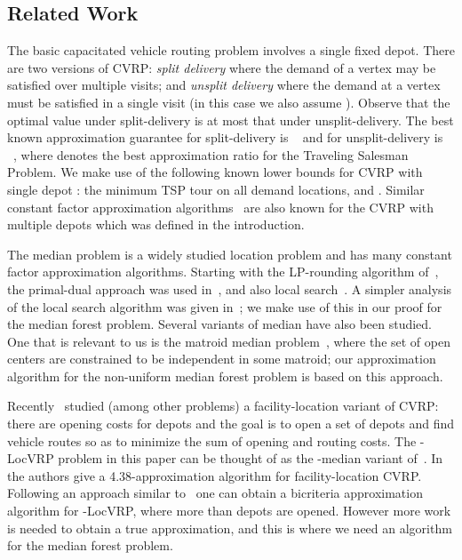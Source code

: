 \documentclass[11pt,twoside,a4paper]{article}
\def\lrp{-LocVRP\xspace}
\begin{document}
\subsection{Related Work}
The basic capacitated vehicle routing problem involves a single fixed depot. There are two versions of CVRP: {\em split
delivery} where the demand of a vertex may be satisfied over multiple visits; and {\em unsplit delivery} where the
demand at a vertex must be satisfied in a single visit (in this case we also assume ). Observe
that the optimal value under split-delivery is at most that under unsplit-delivery. The best known approximation
guarantee for split-delivery is ~\cite{HK85,AG90} and for unsplit-delivery is ~\cite{AG87}, where
 denotes the best approximation ratio for the Traveling Salesman Problem. We make use of the following known
lower bounds for CVRP with single depot : the minimum TSP tour on all demand locations, and . Similar constant factor approximation algorithms~\cite{LS90} are also known for the CVRP with
multiple depots which was defined in the introduction.

The  median problem is a widely studied location problem and has many constant factor approximation algorithms.
Starting with the LP-rounding algorithm of~\cite{CGTS99}, the primal-dual approach was used in~\cite{JV01}, and also
local search~\cite{AGKMMP04}. A simpler analysis of the local search algorithm was given in~\cite{GT08}; we make use of
this in our proof for the  median forest problem. Several variants of  median have also been studied. One that is
relevant to us is the matroid median problem~\cite{KKNSS11}, where the set of open centers are constrained to be
independent in some matroid; our approximation algorithm for the non-uniform  median forest problem is based on this
approach.

Recently~\cite{HKM10} studied (among other problems) a facility-location variant of CVRP: there are opening costs for
depots and the goal is to open a set of depots and find vehicle routes so as to minimize the sum of opening and routing
costs. The \lrp problem in this paper can be thought of as the -median variant of~\cite{HKM10}. In~\cite{HKM10} the
authors give a 4.38-approximation algorithm for facility-location CVRP. Following an approach similar to~\cite{HKM10}
one can obtain a bicriteria approximation algorithm for \lrp, where more than  depots are opened. However more work
is needed to obtain a true approximation, and this is where we need an algorithm for the  median forest problem.
\end{document}
